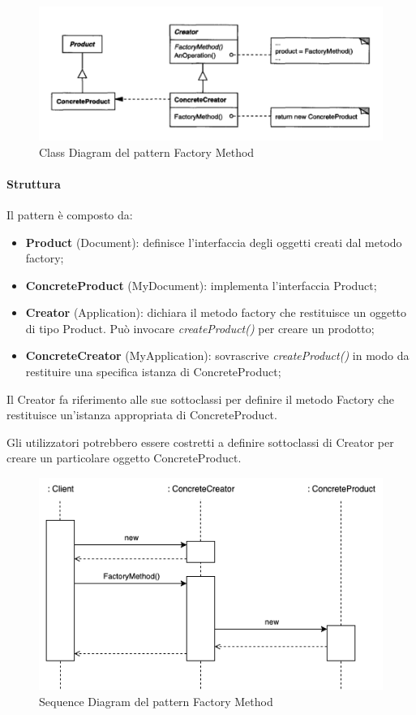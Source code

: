 \begin{figure}[H]
    \centering
    \includegraphics[width=0.75\linewidth]{assets/pattern/factory-method/factory-method-struttura.png}
    \caption{Class Diagram del pattern Factory Method}
\end{figure}

\paragraph{Struttura} Il pattern è composto da:
\begin{itemize}
    \item \textbf{Product} (Document): definisce l'interfaccia degli oggetti creati dal metodo factory;
    \item \textbf{ConcreteProduct} (MyDocument): implementa l'interfaccia Product;
    \item \textbf{Creator} (Application): dichiara il metodo factory che restituisce un oggetto di tipo Product. Può invocare \textit{createProduct()} per creare un prodotto;
    \item \textbf{ConcreteCreator} (MyApplication): sovrascrive \textit{createProduct()} in modo da restituire una specifica istanza di ConcreteProduct;
\end{itemize}

Il Creator fa riferimento alle sue sottoclassi per definire il metodo Factory che restituisce un'istanza appropriata di ConcreteProduct. 

Gli utilizzatori potrebbero essere costretti a definire sottoclassi di Creator per creare un particolare oggetto ConcreteProduct.

\begin{figure}[H]
    \centering
    \includegraphics[width=0.5\linewidth]{assets/pattern/factory-method/factory-method-sequence.drawio.png}
    \caption{Sequence Diagram del pattern Factory Method}
\end{figure}


